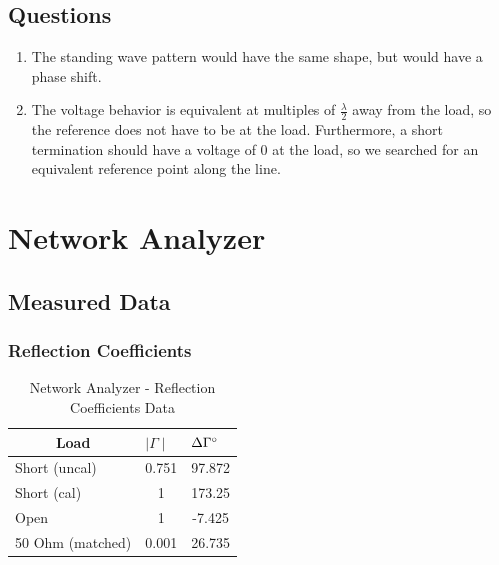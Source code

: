 \documentclass{article}
\begin{document}
\subsection{Questions}
\begin{enumerate}
	\item The standing wave pattern would have the same shape, but would have a phase shift.
	\item The voltage behavior is equivalent at multiples of $\frac{\lambda}{2}$ away from the load, so the reference does not have to be at the load. Furthermore, a short termination should have a voltage of 0 at the load, so we searched for an equivalent reference point along the line.
\end{enumerate}

\section{Network Analyzer}
\subsection{Measured Data}
\subsubsection{Reflection Coefficients}
\begin{table}[H]
\centering
	\begin{tabular}{|l|c|c|}
	\hline
	\multicolumn{1}{|c|}{\textbf{Load}} & \multicolumn{1}{l|}{\textbf{$\mid\Gamma\mid$}} & \multicolumn{1}{l|}{\textbf{$\Delta\Gamma\degree$}} \\ \hline
	Short (uncal)                       & 0.751                               & 97.872                              	\\ \hline
	Short (cal)                         & 1                                   & 173.25                              	\\ \hline
	Open                                & 1                                   & -7.425                              	\\ \hline
	50 Ohm (matched)                    & 0.001                               & 26.735                              	\\ \hline
	\end{tabular}
	\caption{Network Analyzer - Reflection Coefficients Data}
	\label{}
\end{table}
\end{document}
